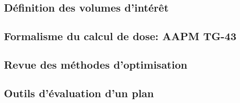 \subsection{Définition des volumes d'intérêt}
\subsection{Formalisme du calcul de dose: AAPM TG-43}
%
\subsection{Revue des méthodes d'optimisation}
%
\subsection{Outils d'évaluation d'un plan}
%